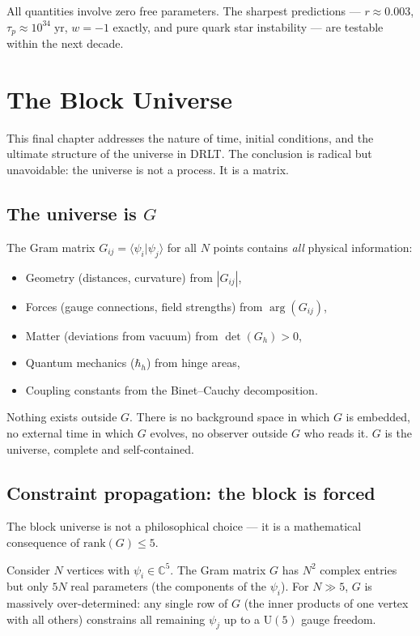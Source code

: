 \documentclass[12pt]{article}
\theoremstyle{remark}
\theoremstyle{definition}
\newcommand{\CC}{\mathbb{C}}
\begin{document}
All quantities involve zero free parameters. The sharpest predictions --- $r \approx 0.003$, $\tau_p \approx 10^{34}\;\text{yr}$, $w = -1$ exactly, and pure quark star instability --- are testable within the next decade.

\section{The Block Universe}
\label{ch:block}

This final chapter addresses the nature of time, initial conditions, and the ultimate structure of the universe in DRLT. The conclusion is radical but unavoidable: the universe is not a process. It is a matrix.

\subsection{The universe is $G$}

The Gram matrix $G_{ij} = \langle\psi_i|\psi_j\rangle$ for all $N$ points contains \emph{all} physical information:
\begin{itemize}
\item Geometry (distances, curvature) from $|G_{ij}|$,
\item Forces (gauge connections, field strengths) from $\arg(G_{ij})$,
\item Matter (deviations from vacuum) from $\det(G_h) > 0$,
\item Quantum mechanics ($\hbar_h$) from hinge areas,
\item Coupling constants from the Binet--Cauchy decomposition.
\end{itemize}

Nothing exists outside $G$. There is no background space in which $G$ is embedded, no external time in which $G$ evolves, no observer outside $G$ who reads it. $G$ is the universe, complete and self-contained.

\subsection{Constraint propagation: the block is forced}

The block universe is not a philosophical choice --- it is a mathematical consequence of $\text{rank}(G) \leq 5$.

Consider $N$ vertices with $\psi_i \in \CC^5$. The Gram matrix $G$ has $N^2$ complex entries but only $5N$ real parameters (the components of the $\psi_i$). For $N \gg 5$, $G$ is massively over-determined: any single row of $G$ (the inner products of one vertex with all others) constrains all remaining $\psi_j$ up to a $\text{U}(5)$ gauge freedom.
\end{document}
